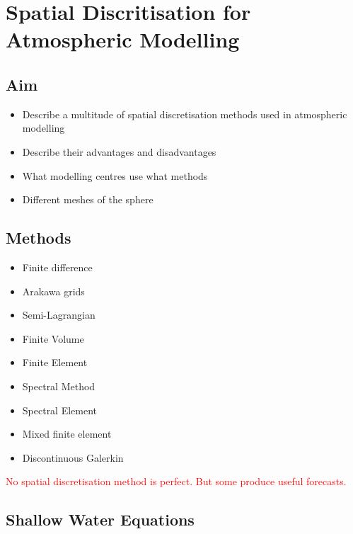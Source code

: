 
\chapter{Spatial Discritisation for Atmospheric Modelling}

\section*{Aim}
\begin{itemize}
\item Describe a multitude of spatial discretisation methods used in atmospheric
modelling
\item Describe their advantages and disadvantages
\item What modelling centres use what methods
\item Different meshes of the sphere
\end{itemize}

\section*{Methods}

\begin{multicols}{2}
\begin{itemize}
\item Finite difference
\item Arakawa grids 
\item Semi-Lagrangian
\item Finite Volume
\item Finite Element
\item Spectral Method
\item Spectral Element
\item Mixed finite element
\item Discontinuous Galerkin
\end{itemize}
\end{multicols}

\textcolor{red}{No spatial discretisation method is perfect. But some
produce useful forecasts.}

\clearpage{}

\section{Shallow Water Equations}

